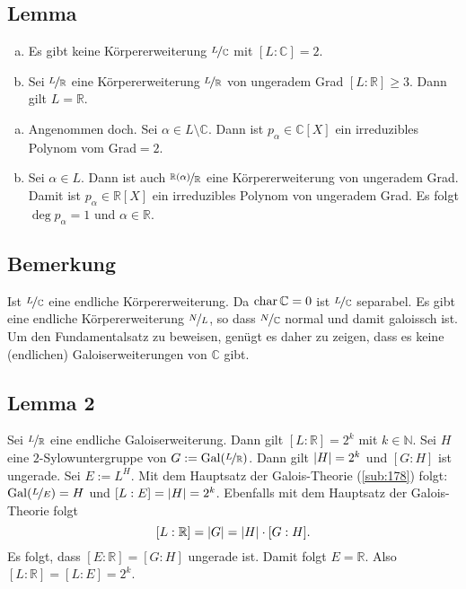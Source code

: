\subsection[Lemma: Grundlegende Eigenschaften des Grades von KE  $\nicefrac{L}{\mathds{C}}$ und $\nicefrac{L}{\mathds{R}}$]{Lemma} %
\label{sub:186}
\begin{enumerate}[a)]
	\item Es gibt keine Körpererweiterung $\nicefrac{L}{\mathds{C}}$ mit $[L : \mathds{C}] =2$.
	\item Sei $\nicefrac{L}{\mathds{R}}$ eine Körpererweiterung $\nicefrac{L}{\mathds{R}}$ von ungeradem Grad $[L:\mathds{R}]\ge 3$. Dann gilt $L=\mathds{R}$.
\end{enumerate}
\begin{enumerate}[a)]
	\item Angenommen doch. Sei $\alpha \in L \setminus \mathds{C}$. Dann ist $p_\alpha \in \mathds{C}[X]$ ein irreduzibles Polynom vom Grad$=2$. \light
	\item Sei $\alpha \in L$. Dann ist auch $\nicefrac{\mathds{R}(\alpha)}{\mathds{R}}$ eine Körpererweiterung von ungeradem Grad. Damit ist $p_\alpha \in \mathds{R}[X]$ ein
	irreduzibles Polynom von ungeradem Grad. Es folgt $\deg p_\alpha =1$ und $\alpha \in \mathds{R}$. \bewende
\end{enumerate}

\subsection[Bemerkung zur Beweisstrategie]{Bemerkung} %
\label{sub:187}
Ist $\nicefrac{L}{\mathds{C}}$ eine endliche Körpererweiterung. Da $\Char \mathds{C} =0$ ist $\nicefrac{L}{\mathds{C}}$ separabel. Es gibt  eine endliche Körpererweiterung $\nicefrac{N}{L}$, so dass $\nicefrac{N}{\mathds{C}}$ normal und damit galoissch ist. Um den Fundamentalsatz zu 
beweisen, genügt es daher zu zeigen, dass es keine (endlichen) Galoiserweiterungen von $\mathds{C}$ gibt.

\subsection[Lemma 2: Endliche KE von $\mathds{R}$ haben Grad $2^k$]{Lemma 2} %
\label{sub:188}
Sei $\nicefrac{L}{\mathds{R}}$ eine endliche Galoiserweiterung. Dann gilt $[L:\mathds{R}]= 2^k$ mit $k \in \mathds{N}$.
Sei $H$ eine $2$-Sylowuntergruppe von $G := \Gal(\nicefrac{L}{\mathds{R}})$. Dann gilt $\abs{H}= 2^k $ und $[G:H]$ ist ungerade. Sei $E := L^H$. Mit dem Hauptsatz der 
Galois-Theorie (\ref{sub:178}) folgt: $\Gal(\nicefrac{L}{E}) =H$ und $[L:E]= \abs{H} = 2^k $. Ebenfalls mit dem Hauptsatz der Galois-Theorie folgt
\[
	[L:\mathds{R}] = \abs{G} = \abs{H} \cdot [G:H].  
\]
Es folgt, dass $[E:\mathds{R}] = [G :H]$ ungerade ist. Damit folgt $E=\mathds{R}$. Also $[L:\mathds{R}] = [L:E] = 2^k$. \bewende


